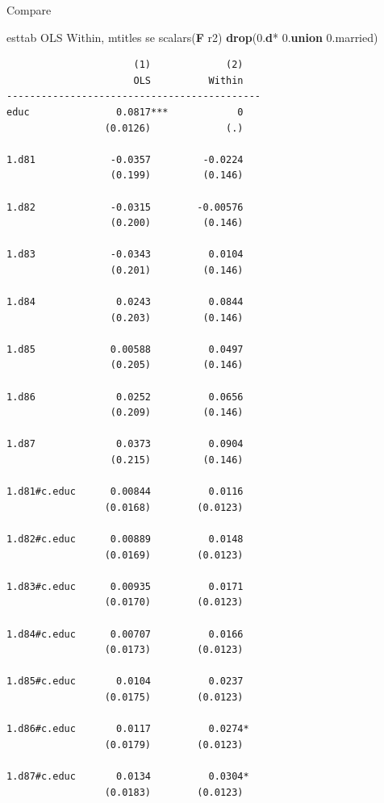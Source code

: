 \documentclass[
]{book}
\newenvironment{Shaded}{\begin{snugshade}}{\end{snugshade}}
\newcommand{\FunctionTok}[1]{\textcolor[rgb]{0.13,0.29,0.53}{\textbf{#1}}}
\newcommand{\KeywordTok}[1]{\textcolor[rgb]{0.13,0.29,0.53}{\textbf{#1}}}
\newcommand{\NormalTok}[1]{#1}
\begin{document}
Compare

\begin{Shaded}
\begin{Highlighting}[]
\NormalTok{esttab OLS Within, mtitles se scalars(}\FunctionTok{F}\NormalTok{ r2) }\KeywordTok{drop}\NormalTok{(0.}\KeywordTok{d}\NormalTok{* 0.}\KeywordTok{union}\NormalTok{ 0.married)}
\end{Highlighting}
\end{Shaded}

\begin{verbatim}
                      (1)             (2)   
                      OLS          Within   
--------------------------------------------
educ               0.0817***            0   
                 (0.0126)             (.)   

1.d81             -0.0357         -0.0224   
                  (0.199)         (0.146)   

1.d82             -0.0315        -0.00576   
                  (0.200)         (0.146)   

1.d83             -0.0343          0.0104   
                  (0.201)         (0.146)   

1.d84              0.0243          0.0844   
                  (0.203)         (0.146)   

1.d85             0.00588          0.0497   
                  (0.205)         (0.146)   

1.d86              0.0252          0.0656   
                  (0.209)         (0.146)   

1.d87              0.0373          0.0904   
                  (0.215)         (0.146)   

1.d81#c.educ      0.00844          0.0116   
                 (0.0168)        (0.0123)   

1.d82#c.educ      0.00889          0.0148   
                 (0.0169)        (0.0123)   

1.d83#c.educ      0.00935          0.0171   
                 (0.0170)        (0.0123)   

1.d84#c.educ      0.00707          0.0166   
                 (0.0173)        (0.0123)   

1.d85#c.educ       0.0104          0.0237   
                 (0.0175)        (0.0123)   

1.d86#c.educ       0.0117          0.0274*  
                 (0.0179)        (0.0123)   

1.d87#c.educ       0.0134          0.0304*  
                 (0.0183)        (0.0123)   


\end{verbatim}
\end{document}

